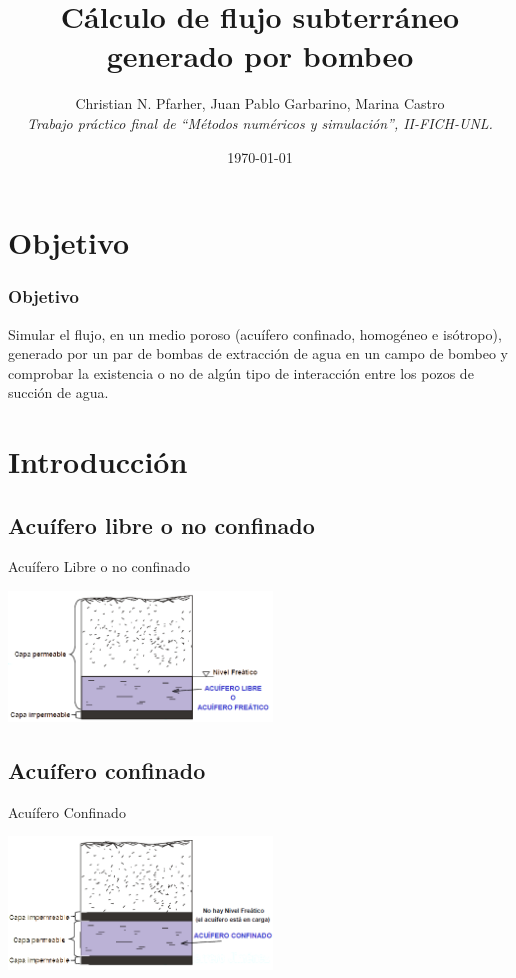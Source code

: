 \documentclass[spanish]{beamer}
\title{Cálculo de flujo subterráneo generado por bombeo}
\author{Christian N. Pfarher, Juan Pablo Garbarino, Marina Castro\\
\textit{Trabajo práctico final de ``Métodos numéricos y simulación'', II-FICH-UNL.}}
\date{\today}
\begin{document}
%
\frame{\titlepage}
%
\section{Objetivo}
\begin{frame}
  \frametitle{Objetivo}
Simular el flujo, en un medio poroso (acuífero confinado, homogéneo e isótropo), generado por un par de bombas de extracción de agua en un campo de bombeo y comprobar la existencia o no de algún tipo de interacción entre los pozos de succión de agua. 
\end{frame}
%
\section{Introducción}
\subsection{Acuífero libre o no confinado}
\begin{frame}{Acuífero Libre o no confinado}
\begin{center}
\includegraphics[width=7cm]{../img/libre}
\end{center}
\end{frame}

\subsection{Acuífero confinado}
\begin{frame}{Acuífero Confinado}
\begin{center}
\includegraphics[width=7cm]{../img/confinado}
\end{center}
\end{frame}
%
\end{document}
